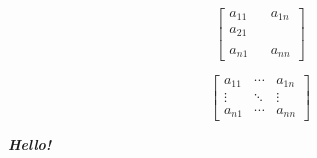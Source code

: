 \documentclass[12pt, a4paper]{article}
\begin{document}
    \begin{equation}
        \begin{bmatrix}
            a_{11} &  & a_{1n} \\
            a_{21} & & \\
            & & \\
            a_{n1} & & a_{nn}
        \end{bmatrix}
    \end{equation}
    
    \begin{equation}
        \begin{bmatrix}
            a_{11} & \cdots & a_{1n} \\
            \vdots & \ddots  & \vdots \\
            a_{n1} & \cdots & a_{nn}
        \end{bmatrix}
    \end{equation}

    \textbf{\textit{Hello!}}
\end{document}
